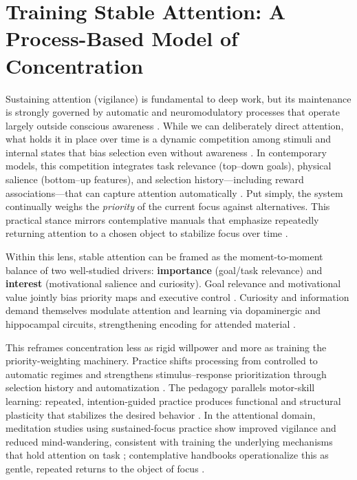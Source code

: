 
\section{Training Stable Attention: A Process-Based Model of Concentration}
\label{sec:training_attention}

Sustaining attention (vigilance) is fundamental to deep work, but its maintenance is strongly governed by automatic and neuromodulatory processes that operate largely outside conscious awareness \cite{langner2013, sarter2001, astonjones2005}.
While we can deliberately direct attention, what holds it in place over time is a dynamic competition among stimuli and internal states that bias selection even without awareness \cite{desimone1995, awh2012, kentridge1999}.
In contemporary models, this competition integrates task relevance (top--down goals), physical salience (bottom--up features), and selection history---including reward associations---that can capture attention automatically \cite{desimone1995, anderson2011, failing2018, awh2012}.
Put simply, the system continually weighs the \emph{priority} of the current focus against alternatives.
This practical stance mirrors contemplative manuals that emphasize repeatedly returning attention to a chosen object to stabilize focus over time \cite{culadasa2017mind}.

Within this lens, stable attention can be framed as the moment-to-moment balance of two well-studied drivers: \textbf{importance} (goal/task relevance) and \textbf{interest} (motivational salience and curiosity).
Goal relevance and motivational value jointly bias priority maps and executive control \cite{pessoa2009}.
Curiosity and information demand themselves modulate attention and learning via dopaminergic and hippocampal circuits, strengthening encoding for attended material \cite{gottlieb2013, gruber2014, kang2009}.

This reframes concentration less as rigid willpower and more as training the priority-weighting machinery.
Practice shifts processing from controlled to automatic regimes and strengthens stimulus--response prioritization through selection history and automatization \cite{shiffrin1977, logan1988, awh2012}.
The pedagogy parallels motor-skill learning: repeated, intention-guided practice produces functional and structural plasticity that stabilizes the desired behavior \cite{dayan2011, doyon2005, krakauer2011}.
In the attentional domain, meditation studies using sustained-focus practice show improved vigilance and reduced mind-wandering, consistent with training the underlying mechanisms that hold attention on task \cite{maclean2010, slagter2007, mrazek2013}; contemplative handbooks operationalize this as gentle, repeated returns to the object of focus \cite{culadasa2017mind}.

